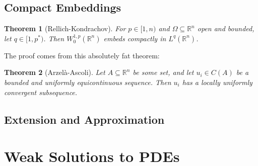 \documentclass{book}
\newcommand{\bbR}{\mathbb{R}}
\newtheorem{theorem}{Theorem}[chapter]
\theoremstyle{definition}
\numberwithin{equation}{chapter}
\begin{document}
\section{Compact Embeddings}

\begin{theorem}[Rellich-Kondrachov]
    For $p \in [1,n)$ and $\Omega \subseteq \bbR^n$ open and bounded, let $q \in [1,p^*)$. Then $W_0^{1,p}(\bbR^n)$ embeds compactly in $L^q(\bbR^n)$.
\end{theorem}
The proof comes from this absolutely fat theorem: 
\begin{theorem}[Arzel\`a-Ascoli]
    Let $A \subseteq \bbR^n$ be some set, and let $u_i \in C(A)$ be a bounded and uniformly equicontinuous sequence. Then $u_i$ has a locally uniformly convergent subsequence.
\end{theorem}


\section{Extension and Approximation}



\chapter{Weak Solutions to PDEs}
\end{document}
